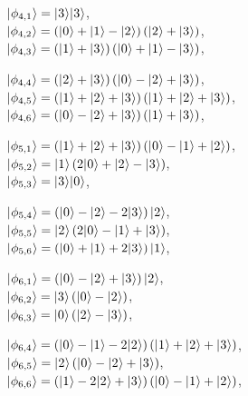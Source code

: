 \begin{example}
\noindent\hspace{8pt}
\begin{minipage}{0.48\textwidth}
  $\ket{\phi_{4,1}} = \ket{3}\ket{3}$,\\
  $\ket{\phi_{4,2}} = \left(\ket{0} + \ket{1} - \ket{2}\right)
  \left(\ket{2} + \ket{3}\right)$,\\
  $\ket{\phi_{4,3}} =  \left(\ket{1} + \ket{3}\right)
  \left(\ket{0} + \ket{1} - \ket{3}\right)$,
\end{minipage}\hfill
\begin{minipage}{0.48\textwidth}
  $\ket{\phi_{4,4}} = \left(\ket{2} + \ket{3}\right)
  \left(\ket{0} - \ket{2} + \ket{3}\right)$, \\
  $\ket{\phi_{4,5}} = \left(\ket{1} + \ket{2} + \ket{3}\right)
  \left(\ket{1} + \ket{2} + \ket{3}\right)$, \\
  $\ket{\phi_{4,6}} = \left(\ket{0} - \ket{2} + \ket{3}\right)
  \left(\ket{1} + \ket{3}\right)$,
\end{minipage}

\vspace{2mm}

\noindent\hspace{8pt}
\begin{minipage}{0.48\textwidth}
  $\ket{\phi_{5,1}} = \left(\ket{1} + \ket{2} + \ket{3}\right)
  \left(\ket{0} - \ket{1} + \ket{2}\right)$,\\
  $\ket{\phi_{5,2}} = \ket{1}\left(2\ket{0} + \ket{2} - \ket{3}\right)$,\\
  $\ket{\phi_{5,3}} = \ket{3}\ket{0}$,
\end{minipage}\hfill
\begin{minipage}{0.48\textwidth}
  $\ket{\phi_{5,4}} = \left(\ket{0} - \ket{2} - 2\ket{3}\right)\ket{2}$, \\
  $\ket{\phi_{5,5}} = \ket{2}\left(2\ket{0} - \ket{1} + \ket{3}\right)$, \\
  $\ket{\phi_{5,6}} = \left(\ket{0} + \ket{1} + 2\ket{3}\right)\ket{1}$,
\end{minipage}

\vspace{2mm}

\noindent\hspace{8pt}
\begin{minipage}{0.48\textwidth}
  $\ket{\phi_{6,1}} = \left(\ket{0} - \ket{2} + \ket{3}\right)\ket{2}$,\\
  $\ket{\phi_{6,2}} = \ket{3}\left(\ket{0} - \ket{2}\right)$,\\
  $\ket{\phi_{6,3}} =  \ket{0}\left(\ket{2} - \ket{3}\right)$,
\end{minipage}\hfill
\begin{minipage}{0.48\textwidth}
  $\ket{\phi_{6,4}} = \left(\ket{0} - \ket{1} - 2\ket{2}\right)
  \left(\ket{1} + \ket{2} + \ket{3}\right)$, \\
  $\ket{\phi_{6,5}} = \ket{2}\left(\ket{0} - \ket{2} + \ket{3}\right)$, \\
  $\ket{\phi_{6,6}} = \left(\ket{1} - 2\ket{2} + \ket{3}\right)
  \left(\ket{0} - \ket{1} + \ket{2}\right)$,
\end{minipage}


\end{example}
